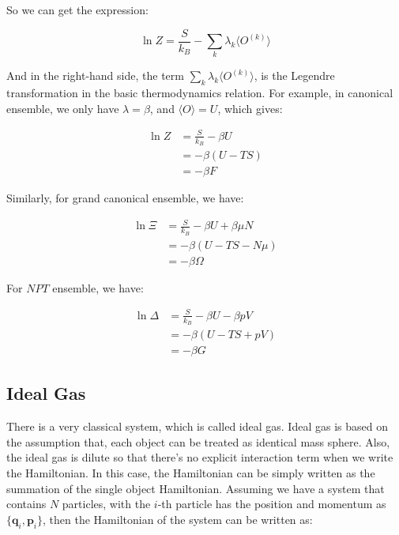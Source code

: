 \documentclass[../main.tex]{subfiles}
\begin{document}
So we can get the expression:

\begin{equation}
    \ln Z = \frac{S}{k_B} - \sum_{k} \lambda_k \langle O^{(k)} \rangle
\end{equation}

And in the right-hand side, the term $\sum_{k} \lambda_k \langle O^{(k)} \rangle$, is the Legendre transformation in the basic thermodynamics relation. For example, in canonical ensemble, we only have $\lambda = \beta$, and $\langle O \rangle = U$, which gives:

\begin{align}
    \ln Z &= \frac{S}{k_B} - \beta U\nonumber\\
    &= -\beta(U - TS)\nonumber\\
    &= -\beta F
\end{align}

Similarly, for grand canonical ensemble, we have:

\begin{align}
    \ln \Xi &= \frac{S}{k_B} - \beta U + \beta \mu N \nonumber\\
    &= -\beta (U - TS - N\mu) \nonumber\\
    &= -\beta \Omega
\end{align}

For $NPT$ ensemble, we have:

\begin{align}
    \ln \Delta &= \frac{S}{k_B} - \beta U - \beta pV \nonumber\\
    &= -\beta (U - TS + pV) \nonumber\\
    &= -\beta G
\end{align}

\subsection{Ideal Gas}

There is a very classical system, which is called ideal gas. Ideal gas is based on the assumption that, each object can be treated as identical mass sphere. Also, the ideal gas is dilute so that there's no explicit interaction term when we write the Hamiltonian. In this case, the Hamiltonian can be simply written as the summation of the single object Hamiltonian. Assuming we have a system that contains $N$ particles, with the $i$-th particle has the position and momentum as $\{\bm{q}_i, \bm{p}_i\}$, then the Hamiltonian of the system can be written as:
\end{document}
